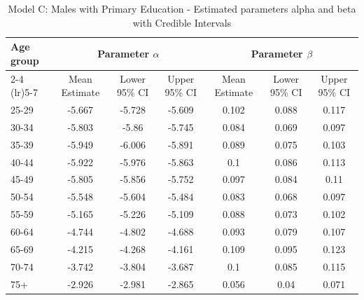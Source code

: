 \begin{landscape}
\begin{table}[htbp]
\centering
\caption{Model C: Males with Primary Education - Estimated parameters alpha and beta  with Credible Intervals}
\label{tab:parameters_ab22}
\begin{tabular}{@{}lcccccc@{}}
\toprule
Age group & \multicolumn{3}{c}{Parameter \(\alpha\)} & \multicolumn{3}{c}{Parameter \(\beta\)} \\ 
\cmidrule(lr){2-4} \cmidrule(lr){5-7}
          & Mean Estimate & Lower 95\% CI & Upper 95\% CI & Mean Estimate & Lower 95\% CI & Upper 95\% CI \\ 
\midrule
25-29 & -5.667 & -5.728 & -5.609 & 0.102 & 0.088 & 0.117 \\
30-34 & -5.803 & -5.86 & -5.745 & 0.084 & 0.069 & 0.097 \\
35-39 & -5.949 & -6.006 & -5.891 & 0.089 & 0.075 & 0.103 \\
40-44 & -5.922 & -5.976 & -5.863 & 0.1 & 0.086 & 0.113 \\
45-49 & -5.805 & -5.856 & -5.752 & 0.097 & 0.084 & 0.11 \\
50-54 & -5.548 & -5.604 & -5.484 & 0.083 & 0.068 & 0.097 \\
55-59 & -5.165 & -5.226 & -5.109 & 0.088 & 0.073 & 0.102 \\
60-64 & -4.744 & -4.802 & -4.688 & 0.093 & 0.079 & 0.107 \\
65-69 & -4.215 & -4.268 & -4.161 & 0.109 & 0.095 & 0.123 \\
70-74 & -3.742 & -3.804 & -3.687 & 0.1 & 0.085 & 0.115 \\
75+ & -2.926 & -2.981 & -2.865 & 0.056 & 0.04 & 0.071 \\
\bottomrule
\end{tabular}
\end{table}
\end{landscape}